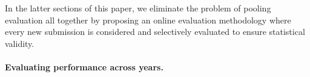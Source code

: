In the latter sections of this paper, we eliminate the problem of pooling evaluation all together by proposing an online evaluation methodology where every new submission is considered and selectively evaluated to ensure statistical validity.

\paragraph{Evaluating performance across years.}
% 
% 
